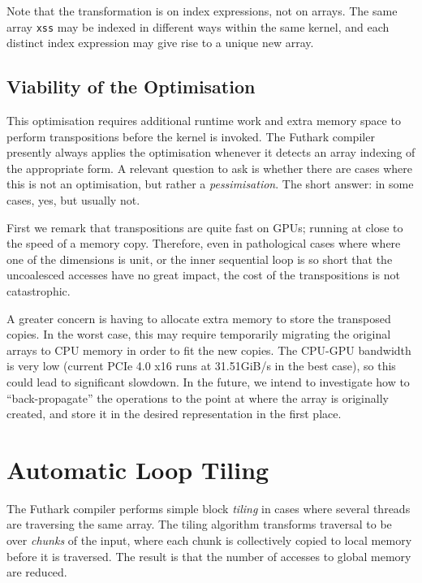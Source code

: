 Note that the transformation is on index expressions, not on arrays.
The same array \lstinline{xss} may be indexed in different ways within
the same kernel, and each distinct index expression may give rise to a
unique new  array.

\subsection{Viability of the Optimisation}

This optimisation requires additional runtime work and extra memory
space to perform transpositions before the kernel is invoked.  The
Futhark compiler presently always applies the optimisation whenever it
detects an array indexing of the appropriate form.  A relevant
question to ask is whether there are cases where this is not an
optimisation, but rather a \textit{pessimisation}.  The short answer:
in some cases, yes, but usually not.

First we remark that transpositions are quite fast on GPUs; running at
close to the speed of a memory copy.  Therefore, even in pathological
cases where where one of the dimensions is unit, or the inner
sequential loop is so short that the uncoalesced accesses have no
great impact, the cost of the transpositions is not catastrophic.

A greater concern is having to allocate extra memory to store the
transposed copies.  In the worst case, this may require temporarily
migrating the original arrays to CPU memory in order to fit the new
copies.  The CPU-GPU bandwidth is very low (current PCIe 4.0 x16 runs
at 31.51GiB/s in the best case), so this could lead to significant
slowdown.  In the future, we intend to investigate how to
``back-propagate'' the  operations to the point at where
the array is originally created, and store it in the desired
representation in the first place.

\section{Automatic Loop Tiling}
\label{sec:automatic-tiling}

The Futhark compiler performs simple block \textit{tiling} in cases
where several threads are traversing the same array.  The tiling
algorithm transforms traversal to be over \textit{chunks} of the
input, where each chunk is collectively copied to local memory before
it is traversed.  The result is that the number of accesses to global
memory are reduced.

